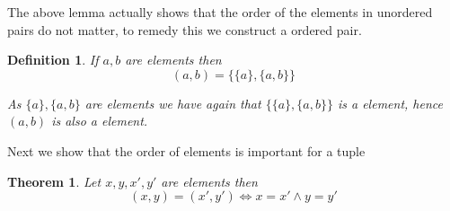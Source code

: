 \documentclass{book}
\newtheorem{definition}{Definition}
{\theorembodyfont{\rmfamily}\newtheorem{example}{Example}}
\newtheorem{theorem}{Theorem}
\begin{document}
The above lemma actually shows that the order of the elements in unordered
pairs do not matter, to remedy this we construct a ordered pair.

\begin{definition}
  \label{pair of elements}If $a, b$ are elements then
  \[ (a, b) = \{ \{ a \}, \{ a, b \} \} \]
  \begin{note}
    As $\{ a \}, \{ a, b \}$ are elements we have again that $\{ \{ a \}, \{
    a, b \} \}$ is a element, hence $(a, b)$ is also a element.
  \end{note}
\end{definition}

Next we show that the order of elements is important for a tuple

\begin{theorem}
  \label{pair equality of pairs}Let $x, y, x', y'$ are elements then
  \[ (x, y) = (x', y') \Leftrightarrow x = x' \wedge y = y' \]
\end{theorem}
\end{document}
